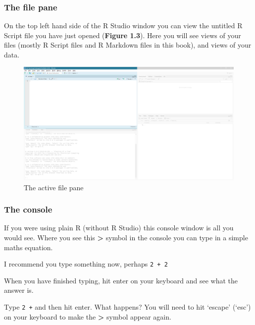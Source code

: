 \documentclass[
]{book}
\begin{document}
\hypertarget{the-file-pane}{%
\subsubsection{The file pane}\label{the-file-pane}}

On the top left hand side of the R Studio window you can view the untitled R Script file you have just opened (\textbf{Figure 1.3}). Here you will see views of your files (mostly R Script files and R Markdown files in this book), and views of your data.

\begin{figure}

{\centering \includegraphics[width=24.81in]{images/02_install/rstud03} 

}

\caption{The active file pane}\label{fig:unnamed-chunk-11}
\end{figure}

\hypertarget{the-console}{%
\subsubsection{The console}\label{the-console}}

If you were using plain R (without R Studio) this console window is all you would see. Where you see this \textbf{\textgreater{}} symbol in the console you can type in a simple maths equation.

I recommend you type something now, perhaps \texttt{2\ +\ 2}

When you have finished typing, hit enter on your keyboard and see what the answer is.

Type \texttt{2\ +} and then hit enter. What happens? You will need to hit `escape' (`esc') on your keyboard to make the \textbf{\textgreater{}} symbol appear again.
\end{document}
